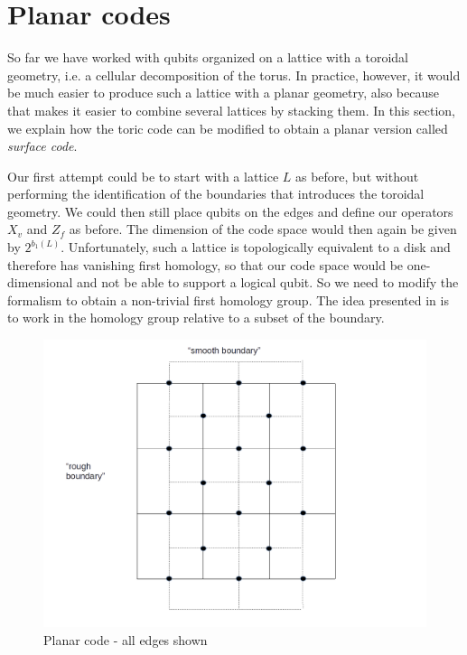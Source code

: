 \documentclass[a4paper, draft]{article}
\theoremstyle{own}
\theoremstyle{remark}
\begin{document}
\section{Planar codes}

So far we have worked with qubits organized on a lattice with a toroidal geometry, i.e. a cellular decomposition of the torus. In practice, however, it would be much easier to produce such a lattice with a planar geometry, also because that makes it easier to combine several lattices by stacking them. In this section, we explain how the toric code can be modified to obtain a planar version called \emph{surface code}.

Our first attempt could be to start with a lattice $L$ as before, but without performing the identification of the boundaries that introduces the toroidal geometry. We could then still place qubits on the edges and define our operators $X_v$ and $Z_f$ as before. The dimension of the code space would then again be given by $2^{b_1(L)}$. Unfortunately, such a lattice is topologically equivalent to a disk and therefore has vanishing first homology, so that our code space would be one-dimensional and not be able to support a logical qubit. So we need to modify the formalism to obtain a non-trivial first homology group. The idea presented in \cite{KitaevBravyi} is to work in the homology group relative to a subset of the boundary. 



\begin{figure}[ht]
\centering
\includegraphics[width=0.7\linewidth]{images/PlanarCodeI}
\caption[Planar code - all edges shown]{Planar code - all edges shown}
\label{fig:PlanarCodeI}
\end{figure}
\end{document}
